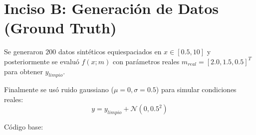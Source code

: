 \section{Inciso B: Generación de Datos (Ground Truth)}

Se generaron $200$ datos sintéticos equiespaciados en $x \in [0.5, 10]$ y posteriormente se evaluó $f(x; m)$ con parámetros reales $m_{real} = [2.0, 1.5, 0.5]^T$ para obtener $y_{limpio}$. 

Finalmente se usó ruido gaussiano ($\mu=0, \sigma=0.5$) para simular condiciones reales:
\begin{equation}
    y = y_{limpio} + \mathcal{N}(0, 0.5^2)
\end{equation}

Código base:

